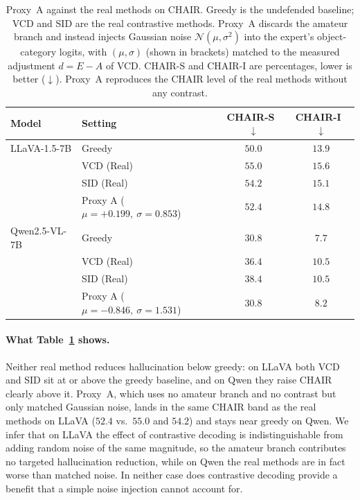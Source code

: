 \begin{table}[t]
  \centering
  \small
  \setlength{\tabcolsep}{6pt}
  \caption{Proxy~A against the real methods on CHAIR. Greedy is the undefended
  baseline; VCD and SID are the real contrastive methods. Proxy~A discards the
  amateur branch and instead injects Gaussian noise $\mathcal{N}(\mu,\sigma^{2})$
  into the expert's object-category logits, with $(\mu,\sigma)$ (shown in
  brackets) matched to the measured adjustment $d = E - A$ of VCD. CHAIR-S and
  CHAIR-I are percentages, lower is better ($\downarrow$). Proxy~A reproduces the
  CHAIR level of the real methods without any contrast.}
  \label{tab:proxyA-noise}
  \begin{tabular}{ll cc}
    \toprule
    Model & Setting & CHAIR-S~$\downarrow$ & CHAIR-I~$\downarrow$ \\
    \midrule
    LLaVA-1.5-7B  & Greedy    & $50.0$ & $13.9$ \\
                  & VCD (Real) & $55.0$ & $15.6$ \\
                  & SID (Real) & $54.2$ & $15.1$ \\
                  & Proxy A ($\mu{=}{+}0.199,\ \sigma{=}0.853$) & $52.4$ & $14.8$ \\
    \midrule
    Qwen2.5-VL-7B & Greedy    & $30.8$ & $7.7$ \\
                  & VCD (Real) & $36.4$ & $10.5$ \\
                  & SID (Real) & $38.4$ & $10.5$ \\
                  & Proxy A ($\mu{=}{-}0.846,\ \sigma{=}1.531$) & $30.8$ & $8.2$ \\
    \bottomrule
  \end{tabular}
\end{table}

\paragraph{What Table~\ref{tab:proxyA-noise} shows.} Neither real method reduces
hallucination below greedy: on LLaVA both VCD and SID sit at or above the greedy
baseline, and on Qwen they raise CHAIR clearly above it. Proxy~A, which uses no
amateur branch and no contrast but only matched Gaussian noise, lands in the same
CHAIR band as the real methods on LLaVA ($52.4$ vs.\ $55.0$ and $54.2$) and stays
near greedy on Qwen. We infer that on LLaVA the effect of contrastive decoding is
indistinguishable from adding random noise of the same magnitude, so the amateur
branch contributes no targeted hallucination reduction, while on Qwen the real
methods are in fact worse than matched noise. In neither case does contrastive
decoding provide a benefit that a simple noise injection cannot account for.
